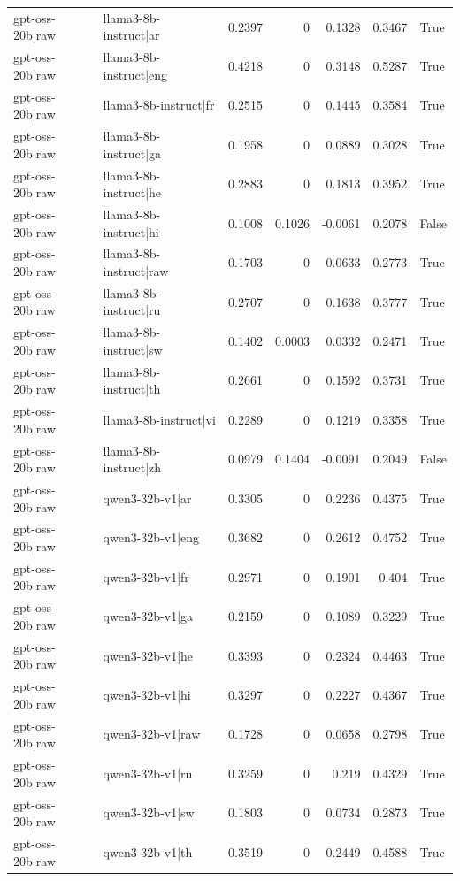 \begin{table}
\begin{tabular}{l l r r r r l}
gpt-oss-20b|raw & llama3-8b-instruct|ar & 0.2397 & 0 & 0.1328 & 0.3467 & True \\
gpt-oss-20b|raw & llama3-8b-instruct|eng & 0.4218 & 0 & 0.3148 & 0.5287 & True \\
gpt-oss-20b|raw & llama3-8b-instruct|fr & 0.2515 & 0 & 0.1445 & 0.3584 & True \\
gpt-oss-20b|raw & llama3-8b-instruct|ga & 0.1958 & 0 & 0.0889 & 0.3028 & True \\
gpt-oss-20b|raw & llama3-8b-instruct|he & 0.2883 & 0 & 0.1813 & 0.3952 & True \\
gpt-oss-20b|raw & llama3-8b-instruct|hi & 0.1008 & 0.1026 & -0.0061 & 0.2078 & False \\
gpt-oss-20b|raw & llama3-8b-instruct|raw & 0.1703 & 0 & 0.0633 & 0.2773 & True \\
gpt-oss-20b|raw & llama3-8b-instruct|ru & 0.2707 & 0 & 0.1638 & 0.3777 & True \\
gpt-oss-20b|raw & llama3-8b-instruct|sw & 0.1402 & 0.0003 & 0.0332 & 0.2471 & True \\
gpt-oss-20b|raw & llama3-8b-instruct|th & 0.2661 & 0 & 0.1592 & 0.3731 & True \\
gpt-oss-20b|raw & llama3-8b-instruct|vi & 0.2289 & 0 & 0.1219 & 0.3358 & True \\
gpt-oss-20b|raw & llama3-8b-instruct|zh & 0.0979 & 0.1404 & -0.0091 & 0.2049 & False \\
gpt-oss-20b|raw & qwen3-32b-v1|ar & 0.3305 & 0 & 0.2236 & 0.4375 & True \\
gpt-oss-20b|raw & qwen3-32b-v1|eng & 0.3682 & 0 & 0.2612 & 0.4752 & True \\
gpt-oss-20b|raw & qwen3-32b-v1|fr & 0.2971 & 0 & 0.1901 & 0.404 & True \\
gpt-oss-20b|raw & qwen3-32b-v1|ga & 0.2159 & 0 & 0.1089 & 0.3229 & True \\
gpt-oss-20b|raw & qwen3-32b-v1|he & 0.3393 & 0 & 0.2324 & 0.4463 & True \\
gpt-oss-20b|raw & qwen3-32b-v1|hi & 0.3297 & 0 & 0.2227 & 0.4367 & True \\
gpt-oss-20b|raw & qwen3-32b-v1|raw & 0.1728 & 0 & 0.0658 & 0.2798 & True \\
gpt-oss-20b|raw & qwen3-32b-v1|ru & 0.3259 & 0 & 0.219 & 0.4329 & True \\
gpt-oss-20b|raw & qwen3-32b-v1|sw & 0.1803 & 0 & 0.0734 & 0.2873 & True \\
gpt-oss-20b|raw & qwen3-32b-v1|th & 0.3519 & 0 & 0.2449 & 0.4588 & True \\

\end{tabular}
\end{table}
